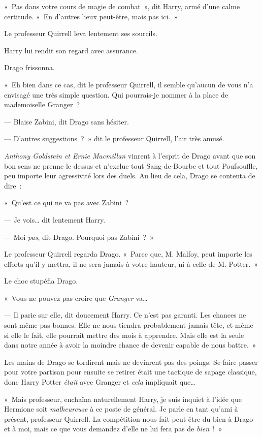 «~Pas dans votre cours de magie de combat~», dit Harry, armé d'une calme certitude. «~En d'autres lieux peut-être, mais pas ici.~»

Le professeur Quirrell leva lentement ses sourcils.

Harry lui rendit son regard avec assurance.

Drago frissonna.

«~Eh bien dans ce cas, dit le professeur Quirrell, il semble qu'aucun de vous n'a envisagé une très simple question. Qui pourrais-je nommer à la place de mademoiselle Granger~?

--- Blaise Zabini, dit Drago sans hésiter.

--- D'autres suggestions~?~» dit le professeur Quirrell, l'air très amusé.

\emph{Anthony Goldstein et Ernie Macmillan} vinrent à l'esprit de Drago avant que son bon sens ne prenne le dessus et n'exclue tout Sang-de-Bourbe et tout Poufsouffle, peu importe leur agressivité lors des duels. Au lieu de cela, Drago se contenta de dire~:

«~Qu'est ce qui ne va pas avec Zabini~?

--- Je vois… dit lentement Harry.

--- Moi \emph{pas}, dit Drago. Pourquoi pas Zabini~?~»

Le professeur Quirrell regarda Drago. «~Parce que, M. Malfoy, peut importe les efforts qu'il y mettra, il ne sera jamais à votre hauteur, ni à celle de M. Potter.~»

Le choc stupéfia Drago.

«~Vous ne pouvez pas croire que \emph{Granger} va…

--- Il parie sur elle, dit doucement Harry. Ce n'est pas garanti. Les chances ne sont même pas bonnes. Elle ne nous tiendra probablement jamais tête, et même si elle le fait, elle pourrait mettre des mois à apprendre. Mais elle est la seule dans notre année à avoir la moindre chance de devenir capable de nous battre.~»

Les mains de Drago se tordirent mais ne devinrent pas des poings. Se faire passer pour votre partisan pour ensuite se retirer était une tactique de sapage classique, donc Harry Potter \emph{était} avec Granger et \emph{cela} impliquait que…

«~Mais professeur, enchaîna naturellement Harry, je suis inquiet à l'idée que Hermione soit \emph{malheureuse} à ce poste de général. Je parle en tant qu'ami à présent, professeur Quirrell. La compétition nous fait peut-être du bien à Drago et à moi, mais ce que vous demandez d'elle ne lui fera pas de \emph{bien}~!~»

